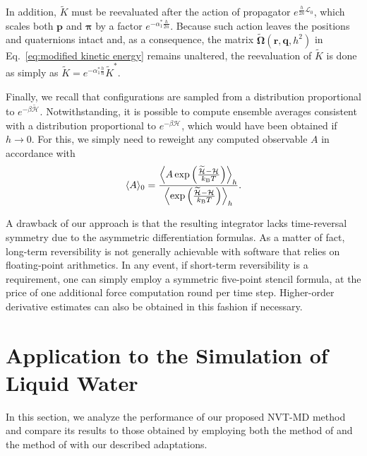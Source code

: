 \documentclass[
journal=jctcce,
layout=twocolumn
]{achemso}
\newcommand{\vt}[1]{\boldsymbol{\mathbf{#1}}}   %
\newcommand{\Ham}[1]{{\mathcal H}_\text{#1}}    %
\newcommand{\timestep}{h}
\newcommand{\refined}[1]{\widetilde{#1}}
\begin{document}
In addition, $\refined K$ must be reevaluated after the action of propagator $e^{\frac{\timestep}{2n} {\mathcal L}_0}$, which scales both $\vt p$ and $\vt \pi$ by a factor $e^{-\alpha_1^\ast \frac{\timestep}{2n}}$.
Because such action leaves the positions and quaternions intact and, as a consequence, the matrix $\refined{\mathbf \Omega}(\vt r, \vt q, \timestep^2)$ in Eq.~\eqref{eq:modified kinetic energy} remains unaltered, the reevaluation of $\refined K$ is done as simply as ${\refined K} = e^{-\alpha_1^\ast \frac{\timestep}{n}} {\refined K}^\ast$.

Finally, we recall that configurations are sampled from a distribution proportional to $e^{-\beta \refined{\Ham{}}}$.
Notwithstanding, it is possible to compute ensemble averages consistent with a distribution proportional to $e^{-\beta \Ham{}}$, which would have been obtained if $\timestep \to 0$.
For this, we simply need to reweight any computed observable $A$ in accordance with \cite{Torrie_1977}
\begin{equation}
\label{eq:reweighting}
\langle A \rangle_0 = \frac{\left\langle A \exp \left({\frac{\refined{\Ham{}} - \Ham{}}{k_\text{\tiny B} T}}\right)\right\rangle_\timestep}{\left\langle \exp \left({\frac{\refined{\Ham{}} - \Ham{}}{k_\text{\tiny B} T}}\right)\right\rangle_\timestep}.
\end{equation}

A drawback of our approach is that the resulting integrator lacks time-reversal symmetry due to the asymmetric differentiation formulas.
As a matter of fact, long-term reversibility is not generally achievable with software that relies on floating-point arithmetics.
In any event, if short-term reversibility is a requirement, one can simply employ a symmetric five-point stencil formula, at the price of one additional force computation round per time step.
Higher-order derivative estimates can also be obtained in this fashion if necessary.

\section{Application to the Simulation of Liquid Water}
\label{sec:numerical_results}

In this section, we analyze the performance of our proposed NVT-MD method and compare its results to those obtained by employing both the method of \citeauthor{Kamberaj_2005} \cite{Kamberaj_2005} and the method of \citeauthor{Martyna_1996} \cite{Martyna_1996} with our described adaptations.
\end{document}
